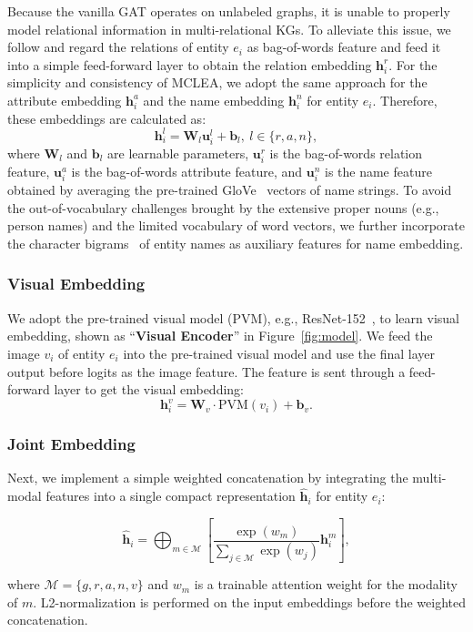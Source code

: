 \documentclass[11pt]{article}
\begin{document}
Because the vanilla GAT operates on unlabeled graphs, it is unable to properly model relational information in multi-relational KGs.
To alleviate this issue, we follow \cite{yang2019aligning} and regard the relations of entity $e_i$ as bag-of-words feature and feed it into a simple feed-forward layer to obtain the relation embedding $\bm{h}^r_i$.
For the simplicity and consistency of MCLEA, we adopt the same approach for the attribute embedding $\bm{h}^a_i$ and the name embedding $\bm{h}^n_i$ for entity $e_i$.
Therefore, these embeddings are calculated as:
\begin{equation}
    \bm{h}^l_i = \mathbf{W}_l\bm{u}^l_i + \mathbf{b}_l,\ l\in\{r,a,n\},
\end{equation}
where $\mathbf{W}_l$ and $\mathbf{b}_l$ are learnable parameters, $\bm{u}^r_i$ is the bag-of-words relation feature, $\bm{u}^a_i$ is the bag-of-words attribute feature, and $\bm{u}^n_i$ is the name feature obtained by averaging the pre-trained GloVe~\cite{pennington2014glove} vectors of name strings.
To avoid the out-of-vocabulary challenges brought by the extensive proper nouns (e.g., person names) and the limited vocabulary of word vectors, we further incorporate the character bigrams~\cite{mao2021alignment} of entity names as auxiliary features for name embedding.

\subsubsection{Visual Embedding}

We adopt the pre-trained visual model (PVM), e.g., ResNet-152~\cite{he2016deep}, to learn visual embedding, shown as ``\textbf{Visual Encoder}'' in Figure~\ref{fig:model}.
We feed the image $v_i$ of entity $e_i$ into the pre-trained visual model and use the final layer output before logits as the image feature.
The feature is sent through a feed-forward layer to get the visual embedding:
\begin{equation}
    \bm{h}^v_i = \mathbf{W}_v\cdot \text{PVM}({v_i})+\mathbf{b}_v.
\end{equation}

\subsubsection{Joint Embedding}

Next, we implement a simple weighted concatenation by integrating the multi-modal features into a single compact representation $\hat{\bm{h}}_i$ for entity $e_i$:
\begin{small}
\begin{equation}
    \hat{\bm{h}}_i = \bigoplus_{m\in\mathcal{M}}
    \left[
    \frac{
    \exp(w_m)
    }{
    \sum_{j\in \mathcal{M}}\exp(w_j)
    }
    \bm{h}^{m}_{i}
    \right],
    \label{emb:joint}
\end{equation}
\end{small}\noindent
where $\mathcal{M}=\{g,r,a,n,v\}$ and $w_m$ is a trainable attention weight for the modality of $m$. L2-normalization is performed on the input embeddings before the weighted concatenation.
\end{document}
